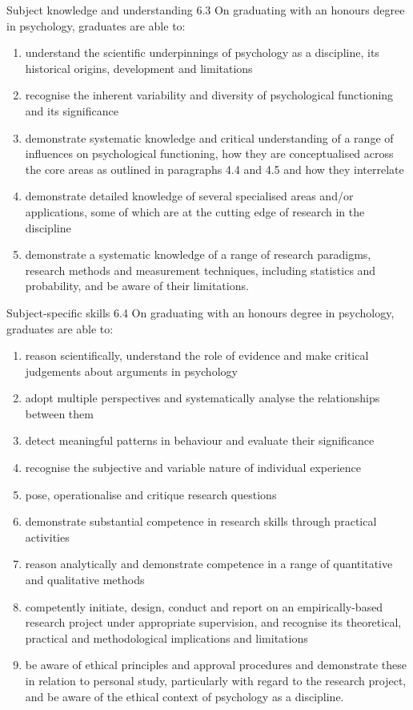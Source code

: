 \documentclass[
  11pt,
  letterpaper,
  oneside,
  open=any]{scrbook}
\begin{document}
Subject knowledge and understanding 6.3 On graduating with an honours
degree in psychology, graduates are able to:

\begin{enumerate}
\def\labelenumi{\arabic{enumi}.}
\item
  understand the scientific underpinnings of psychology as a discipline,
  its historical origins, development and limitations
\item
  recognise the inherent variability and diversity of psychological
  functioning and its significance
\item
  demonstrate systematic knowledge and critical understanding of a range
  of influences on psychological functioning, how they are
  conceptualised across the core areas as outlined in paragraphs 4.4 and
  4.5 and how they interrelate
\item
  demonstrate detailed knowledge of several specialised areas and/or
  applications, some of which are at the cutting edge of research in the
  discipline
\item
  demonstrate a systematic knowledge of a range of research paradigms,
  research methods and measurement techniques, including statistics and
  probability, and be aware of their limitations.
\end{enumerate}

Subject-specific skills 6.4 On graduating with an honours degree in
psychology, graduates are able to:

\begin{enumerate}
\def\labelenumi{\arabic{enumi}.}
\item
  reason scientifically, understand the role of evidence and make
  critical judgements about arguments in psychology
\item
  adopt multiple perspectives and systematically analyse the
  relationships between them
\item
  detect meaningful patterns in behaviour and evaluate their
  significance
\item
  recognise the subjective and variable nature of individual experience
\item
  pose, operationalise and critique research questions
\item
  demonstrate substantial competence in research skills through
  practical activities
\item
  reason analytically and demonstrate competence in a range of
  quantitative and qualitative methods
\item
  competently initiate, design, conduct and report on an
  empirically-based research project under appropriate supervision, and
  recognise its theoretical, practical and methodological implications
  and limitations
\item
  be aware of ethical principles and approval procedures and demonstrate
  these in relation to personal study, particularly with regard to the
  research project, and be aware of the ethical context of psychology as
  a discipline.
\end{enumerate}
\end{document}
